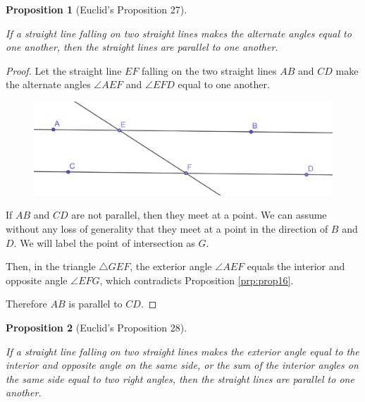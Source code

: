 \documentclass[
]{book}
\newtheorem{proposition}{Proposition}[chapter]
\theoremstyle{definition}
\theoremstyle{definition}
\theoremstyle{definition}
\theoremstyle{definition}
\theoremstyle{remark}
\begin{document}
\begin{proposition}[Euclid's Proposition 27]
\protect\hypertarget{prp:prop27}{}\label{prp:prop27}

If a straight line falling on two straight lines makes the alternate angles equal to one another, then the straight lines are parallel to one another.

\end{proposition}

\begin{proof}

Let the straight line \(EF\) falling on the two straight lines \(AB\) and \(CD\) make the alternate angles \(\angle AEF\) and \(\angle EFD\) equal to one another.

\begin{figure}

{\centering \includegraphics[width=0.75\linewidth]{images/Prop27} 

}

\end{figure}

If \(AB\) and \(CD\) are not parallel, then they meet at a point. We can assume without any loss of generality that they meet at a point in the direction of \(B\) and \(D\). We will label the point of intersection as \(G\).

Then, in the triangle \(\triangle GEF\), the exterior angle \(\angle AEF\) equals the interior and opposite angle \(\angle EFG\), which contradicts Proposition \ref{prp:prop16}.

Therefore \(AB\) is parallel to \(CD\).

\end{proof}

\begin{proposition}[Euclid's Proposition 28]
\protect\hypertarget{prp:prop28}{}\label{prp:prop28}

If a straight line falling on two straight lines makes the exterior angle equal to the interior and opposite angle on the same side, or the sum of the interior angles on the same side equal to two right angles, then the straight lines are parallel to one another.

\end{proposition}
\end{document}
